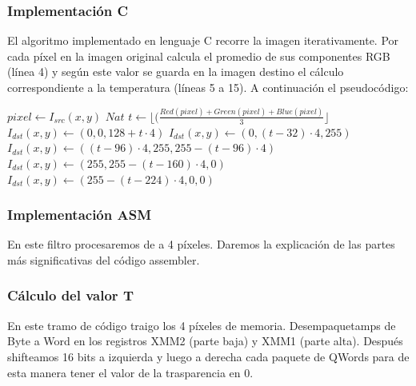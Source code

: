 \hfill
\subsubsection{Implementación C}

El algoritmo implementado en lenguaje C recorre la imagen iterativamente. Por cada píxel en la imagen original calcula el promedio de sus componentes RGB (línea 4) y según este valor se guarda en la imagen destino el cálculo correspondiente a la temperatura (líneas 5 a 15). A continuación el pseudocódigo:
	
\begin{algorithm}[H]
  \begin{algorithmic}[1]
				\STATE $ pixel \gets I_{src}(x,y)$
				\STATE $Nat $ $ t \gets \lfloor(\frac{Red(pixel)+Green(pixel)+Blue(pixel)}{3}\rfloor$
					\STATE $I_{dst}(x,y) \gets (0,0,128+t \cdot 4)$
					\STATE $I_{dst}(x,y) \gets (0,(t-32) \cdot 4,255)$
					\STATE $I_{dst}(x,y) \gets ((t-96) \cdot 4,255, 255-(t-96) \cdot 4)$
					\STATE $I_{dst}(x,y) \gets (255, 255-(t-160) \cdot 4, 0)$
				\ELSE		
					\STATE $I_{dst}(x,y) \gets (255-(t-224) \cdot 4, 0, 0)$
				\ENDIF	
			\ENDFOR
		 \ENDFOR
  \end{algorithmic}
  \caption{$temperature (I_{src}, I_{dst})$}
  \label{alg:temperature}
\end{algorithm}	

\subsubsection{Implementación ASM}
En este filtro procesaremos de a 4 píxeles. Daremos la explicación de las partes más significativas del código assembler.

\subsubsection*{Cálculo del valor T}

En este tramo de código traigo los 4 píxeles de memoria. Desempaquetamps de Byte a Word en los registros XMM2 (parte baja) y XMM1 (parte alta). Después shifteamos 16 bits a izquierda y luego a derecha cada paquete de QWords para de esta manera tener el valor de la trasparencia en 0.

